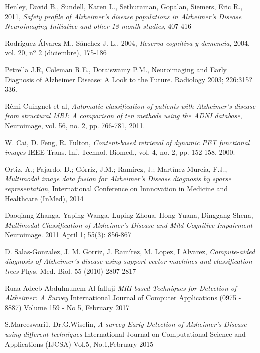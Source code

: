 
\begin{thebibliography}{9}

	Henley, David B.,
	Sundell, Karen L.,
	Sethuraman, Gopalan,
 	Siemers, Eric R.,
	2011,	
	\textit{Safety profile of Alzheimer's disease populations in Alzheimer's Disease Neuroimaging 			Initiative and other 18-month studies},
 	407-416

	Rodríguez Álvarez M., Sánchez J. L.,
	2004,
	\textit{Reserva cognitiva y demencia},
	2004, vol. 20, nº 2 (diciembre), 175-186 
	
 Petrella J.R, Coleman R.E., Doraiswamy P.M., Neuroimaging and Early Diagnosis
of Alzheimer Disease: A Look to the Future. Radiology 2003; 226:315?336.



	Rémi Cuingnet et al, 
	\textit{Automatic classification of patients with Alzheimer's disease from
	structural MRI: A comparison of ten methods using the ADNI database},
	 Neuroimage,
	vol. 56, no. 2, pp. 766-781, 2011.

	W. Cai, 
	D. Feng, 
	R. Fulton, 
	\textit{Content-based retrieval of dynamic PET functional images} 
	IEEE Trans. Inf. Technol. Biomed., vol. 4, no. 2, pp. 152-158, 2000.

	Ortiz, A.; 
	Fajardo, D.; 
	Górriz, J.M.; 
	Ramírez, J.; 
	Martínez-Murcia, F.J.,
	\textit{Multimodal
image data fusion for Alzheimer's Disease diagnosis by sparse representation}, 
International Conference on Innnovation in Medicine and Healthcare (InMed), 2014


	Daoqiang Zhanga, 
	Yaping Wanga, 
	Luping Zhoua, 
	Hong Yuana, 
	Dinggang Shena,
	\textit{Multimodal Classification of Alzheimer's Disease and Mild Cognitive Impairment}
	Neuroimage. 2011 April 1; 55(3): 856-867


	D. Salas-Gonzalez, 
	J. M. Gorriz, 
	J. Ramírez, 
	M. Lopez, 
	I Alvarez,
	\textit{Compute-aided diagnosis of Alzheimer's disease using support vector machines and classification trees}
	Phys. Med. Biol. 55 (2010) 2807-2817


	Ruaa Adeeb Abdulmunem Al-falluji
	\textit{MRI based Techniques for Detection of Alzheimer: A Survey}
	International Journal of Computer Applications (0975 - 8887)
	Volume 159 - No 5, February 2017

	S.Mareeswari1, 
	Dr.G.Wiselin,
	\textit{A survey Early Detection of Alzheimer's Disease using different techniques}
	International Journal on Computational Science and Applications (IJCSA) Vol.5, No.1,February 2015


\end{thebibliography}
